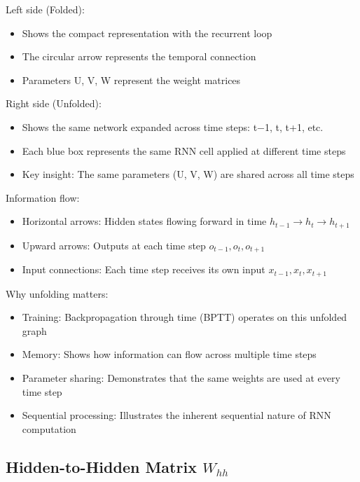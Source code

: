 \documentclass[
]{article}
\providecommand{\tightlist}{%
  \setlength{\itemsep}{0pt}\setlength{\parskip}{0pt}}
\begin{document}
Left side (Folded):

\begin{itemize}
\tightlist
\item
  Shows the compact representation with the recurrent loop
\item
  The circular arrow represents the temporal connection
\item
  Parameters U, V, W represent the weight matrices
\end{itemize}

Right side (Unfolded):

\begin{itemize}
\tightlist
\item
  Shows the same network expanded across time steps: t−1, t, t+1, etc.
\item
  Each blue box represents the same RNN cell applied at different time
  steps
\item
  Key insight: The same parameters (U, V, W) are shared across all time
  steps
\end{itemize}

Information flow:

\begin{itemize}
\tightlist
\item
  Horizontal arrows: Hidden states flowing forward in time
  \(h_{t-1} \to h_t \to h_{t+1}\)
\item
  Upward arrows: Outputs at each time step \(o_{t-1}, o_t, o_{t+1}\)
\item
  Input connections: Each time step receives its own input
  \(x_{t-1}, x_t, x_{t+1}\)
\end{itemize}

Why unfolding matters:

\begin{itemize}
\tightlist
\item
  Training: Backpropagation through time (BPTT) operates on this
  unfolded graph
\item
  Memory: Shows how information can flow across multiple time steps
\item
  Parameter sharing: Demonstrates that the same weights are used at
  every time step
\item
  Sequential processing: Illustrates the inherent sequential nature of
  RNN computation
\end{itemize}

\subsection{\texorpdfstring{Hidden-to-Hidden Matrix
\(W_{hh}\)}{Hidden-to-Hidden Matrix W\_\{hh\}}}\label{hidden-to-hidden-matrix-w_hh}
\end{document}
